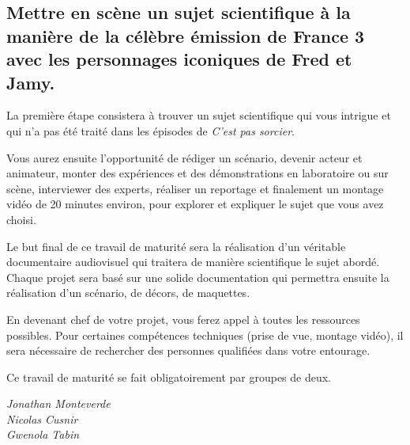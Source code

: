 \documentclass[
  10pt,
  french,
  a5paper,
  openany]{book}
\newenvironment{signature}{\begin{flushright}}{\end{flushright}}
\begin{document}

\hypertarget{mettre-en-scuxe8ne-un-sujet-scientifique-uxe0-la-maniuxe8re-de-la-cuxe9luxe8bre-uxe9mission-de-france-3-avec-les-personnages-iconiques-de-fred-et-jamy.}{%
\subsection*{Mettre en scène un sujet scientifique à la manière de la célèbre émission de France 3 avec les personnages iconiques de Fred et Jamy.}\label{mettre-en-scuxe8ne-un-sujet-scientifique-uxe0-la-maniuxe8re-de-la-cuxe9luxe8bre-uxe9mission-de-france-3-avec-les-personnages-iconiques-de-fred-et-jamy.}}


La première étape consistera à trouver un sujet scientifique qui vous intrigue et qui n'a pas été traité dans les épisodes de \emph{C'est pas sorcier}.

Vous aurez ensuite l'opportunité de rédiger un scénario, devenir acteur et animateur, monter des expériences et des démonstrations en laboratoire ou sur scène, interviewer des experts, réaliser un reportage et finalement un montage vidéo de 20 minutes environ, pour explorer et expliquer le sujet que vous avez choisi.

Le but final de ce travail de maturité sera la réalisation d'un véritable documentaire audiovisuel qui traitera de manière scientifique le sujet abordé. Chaque projet sera basé sur une solide documentation qui permettra ensuite la réalisation d'un scénario, de décors, de maquettes.

\clearpage

En devenant chef de votre projet, vous ferez appel à toutes les ressources possibles. Pour certaines compétences techniques (prise de vue, montage vidéo), il sera nécessaire de rechercher des personnes qualifiées dans votre entourage.

Ce travail de maturité se fait obligatoirement par groupes de deux.

\begin{signature}
\emph{Jonathan Monteverde}\\
\emph{Nicolas Cusnir}\\
\emph{Gwenola Tabin}

\end{signature}
\end{document}
